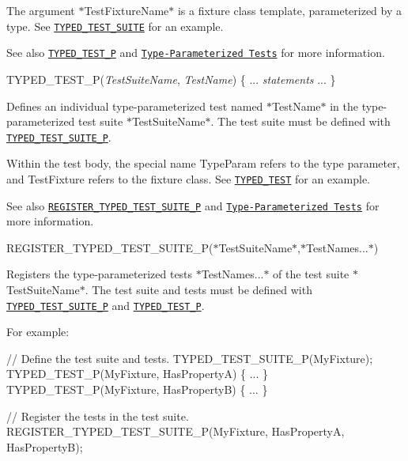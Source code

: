 The argument $\ast${\ttfamily Test\+Fixture\+Name}$\ast$ is a fixture class template, parameterized by a type. See \href{#TYPED_TEST_SUITE}{\tt {\ttfamily T\+Y\+P\+E\+D\+\_\+\+T\+E\+S\+T\+\_\+\+S\+U\+I\+TE}} for an example.

See also \href{#TYPED_TEST_P}{\tt {\ttfamily T\+Y\+P\+E\+D\+\_\+\+T\+E\+S\+T\+\_\+P}} and \href{../advanced.md#type-parameterized-tests}{\tt Type-\/\+Parameterized Tests} for more information.


\begin{DoxyPre}
TYPED\_TEST\_P({\itshape TestSuiteName}, {\itshape TestName}) \{
  ... {\itshape statements} ...
\}
\end{DoxyPre}


Defines an individual type-\/parameterized test named $\ast${\ttfamily Test\+Name}$\ast$ in the type-\/parameterized test suite $\ast${\ttfamily Test\+Suite\+Name}$\ast$. The test suite must be defined with \href{#TYPED_TEST_SUITE_P}{\tt {\ttfamily T\+Y\+P\+E\+D\+\_\+\+T\+E\+S\+T\+\_\+\+S\+U\+I\+T\+E\+\_\+P}}.

Within the test body, the special name {\ttfamily Type\+Param} refers to the type parameter, and {\ttfamily Test\+Fixture} refers to the fixture class. See \href{#TYPED_TEST}{\tt {\ttfamily T\+Y\+P\+E\+D\+\_\+\+T\+E\+ST}} for an example.

See also \href{#REGISTER_TYPED_TEST_SUITE_P}{\tt {\ttfamily R\+E\+G\+I\+S\+T\+E\+R\+\_\+\+T\+Y\+P\+E\+D\+\_\+\+T\+E\+S\+T\+\_\+\+S\+U\+I\+T\+E\+\_\+P}} and \href{../advanced.md#type-parameterized-tests}{\tt Type-\/\+Parameterized Tests} for more information.

{\ttfamily R\+E\+G\+I\+S\+T\+E\+R\+\_\+\+T\+Y\+P\+E\+D\+\_\+\+T\+E\+S\+T\+\_\+\+S\+U\+I\+T\+E\+\_\+P(}$\ast${\ttfamily Test\+Suite\+Name}$\ast${\ttfamily ,}$\ast${\ttfamily Test\+Names...}$\ast${\ttfamily )}

Registers the type-\/parameterized tests $\ast${\ttfamily Test\+Names...}$\ast$ of the test suite $\ast${\ttfamily Test\+Suite\+Name}$\ast$. The test suite and tests must be defined with \href{#TYPED_TEST_SUITE_P}{\tt {\ttfamily T\+Y\+P\+E\+D\+\_\+\+T\+E\+S\+T\+\_\+\+S\+U\+I\+T\+E\+\_\+P}} and \href{#TYPED_TEST_P}{\tt {\ttfamily T\+Y\+P\+E\+D\+\_\+\+T\+E\+S\+T\+\_\+P}}.

For example\+:


\begin{DoxyCode}
\textcolor{comment}{// Define the test suite and tests.}
TYPED\_TEST\_SUITE\_P(MyFixture);
TYPED\_TEST\_P(MyFixture, HasPropertyA) \{ ... \}
TYPED\_TEST\_P(MyFixture, HasPropertyB) \{ ... \}

\textcolor{comment}{// Register the tests in the test suite.}
REGISTER\_TYPED\_TEST\_SUITE\_P(MyFixture, HasPropertyA, HasPropertyB);
\end{DoxyCode}


